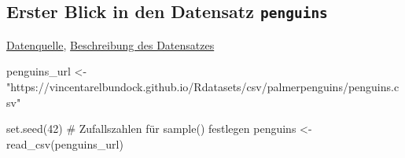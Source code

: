 \documentclass[
  a4paper,
  DIV=11]{scrreprt}
\newenvironment{Shaded}{\begin{snugshade}}{\end{snugshade}}
\newcommand{\CommentTok}[1]{\textcolor[rgb]{0.37,0.37,0.37}{#1}}
\newcommand{\DecValTok}[1]{\textcolor[rgb]{0.68,0.00,0.00}{#1}}
\newcommand{\FunctionTok}[1]{\textcolor[rgb]{0.28,0.35,0.67}{#1}}
\newcommand{\NormalTok}[1]{\textcolor[rgb]{0.00,0.23,0.31}{#1}}
\newcommand{\OtherTok}[1]{\textcolor[rgb]{0.00,0.23,0.31}{#1}}
\newcommand{\StringTok}[1]{\textcolor[rgb]{0.13,0.47,0.30}{#1}}
\theoremstyle{definition}
\theoremstyle{remark}
\begin{document}
\hypertarget{erster-blick-in-den-datensatz-penguins}{%
\subsection{\texorpdfstring{Erster Blick in den Datensatz
\texttt{penguins}}{Erster Blick in den Datensatz penguins}}\label{erster-blick-in-den-datensatz-penguins}}

\href{https://vincentarelbundock.github.io/Rdatasets/csv/palmerpenguins/penguins.csv}{Datenquelle},
\href{https://vincentarelbundock.github.io/Rdatasets/doc/palmerpenguins/penguins.html}{Beschreibung
des Datensatzes}

\begin{Shaded}
\begin{Highlighting}[]
\NormalTok{penguins\_url }\OtherTok{\textless{}{-}} \StringTok{"https://vincentarelbundock.github.io/Rdatasets/csv/palmerpenguins/penguins.csv"}
\end{Highlighting}
\end{Shaded}

\begin{Shaded}
\begin{Highlighting}[]
\FunctionTok{set.seed}\NormalTok{(}\DecValTok{42}\NormalTok{)  }\CommentTok{\# Zufallszahlen für \textasciigrave{}sample()\textasciigrave{} festlegen}
\NormalTok{penguins }\OtherTok{\textless{}{-}} 
  \FunctionTok{read\_csv}\NormalTok{(penguins\_url)}
\end{Highlighting}
\end{Shaded}
\end{document}
